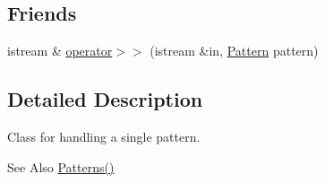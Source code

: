 \subsection*{Friends}
\begin{DoxyCompactItemize}
\item 
istream \& \hyperlink{classPattern_a27ae4d6c06ab6d17ff9392ba3f5a5532}{operator$>$$>$} (istream \&in, \hyperlink{classPattern}{Pattern} pattern)
\end{DoxyCompactItemize}


\subsection{Detailed Description}
Class for handling a single pattern. \begin{DoxySeeAlso}{See Also}
\hyperlink{classPatterns}{Patterns()} 
\end{DoxySeeAlso}


